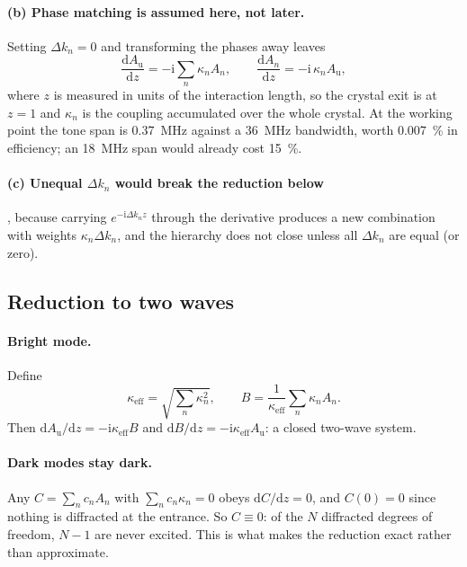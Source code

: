 \documentclass[11pt,a4paper]{article}
\newcommand{\Au}{\ensuremath{A_\mathrm{u}}}
\begin{document}
\paragraph{(b) Phase matching is assumed here, not later.} Setting
$\Delta k_n = 0$ and transforming the phases away leaves
\begin{equation}
  \frac{\mathrm{d}\Au}{\mathrm{d}z} = -\mathrm{i}\sum_n \kappa_n A_n ,
  \qquad
  \frac{\mathrm{d}A_n}{\mathrm{d}z} = -\mathrm{i}\,\kappa_n \Au ,
  \label{eq:coupled}
\end{equation}
where $z$ is measured in units of the interaction length, so the crystal exit
is at $z=1$ and $\kappa_n$ is the coupling accumulated over the whole
crystal. At the working point the tone span is \SI{0.37}{\mega\hertz} against
a \SI{36}{\mega\hertz} bandwidth, worth \SI{0.007}{\percent} in efficiency;
an \SI{18}{\mega\hertz} span would already cost \SI{15}{\percent}.

\paragraph{(c) Unequal $\Delta k_n$ would break the reduction below}, because
carrying $e^{-\mathrm{i}\Delta k_n z}$ through the derivative produces a new
combination with weights $\kappa_n\Delta k_n$, and the hierarchy does not
close unless all $\Delta k_n$ are equal (or zero).

\subsection{Reduction to two waves}

\paragraph{Bright mode.} Define
\begin{equation}
  \kappa_\mathrm{eff} = \sqrt{\textstyle\sum_n \kappa_n^2} ,
  \qquad
  B = \frac{1}{\kappa_\mathrm{eff}}\sum_n \kappa_n A_n .
  \label{eq:brightmode}
\end{equation}
Then $\mathrm{d}\Au/\mathrm{d}z = -\mathrm{i}\kappa_\mathrm{eff}B$ and
$\mathrm{d}B/\mathrm{d}z = -\mathrm{i}\kappa_\mathrm{eff}\Au$: a closed
two-wave system.

\paragraph{Dark modes stay dark.} Any $C=\sum_n c_n A_n$ with
$\sum_n c_n\kappa_n = 0$ obeys $\mathrm{d}C/\mathrm{d}z = 0$, and $C(0)=0$
since nothing is diffracted at the entrance. So $C\equiv0$: of the $N$
diffracted degrees of freedom, $N-1$ are never excited. This is what makes
the reduction exact rather than approximate.
\end{document}
